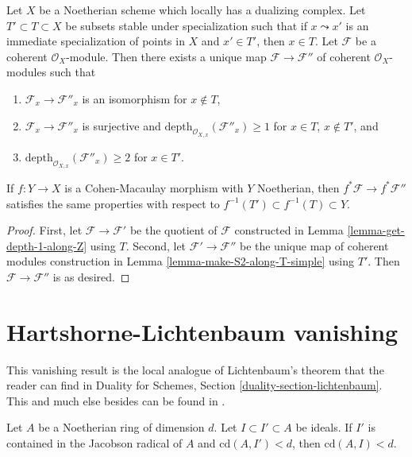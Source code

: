 \begin{lemma}
\label{lemma-make-S2-along-T}
Let $X$ be a Noetherian scheme which locally has a dualizing complex.
Let $T' \subset T \subset X$ be subsets stable under specialization
such that if $x \leadsto x'$ is an immediate specialization
of points in $X$ and $x' \in T'$, then $x \in T$. Let $\mathcal{F}$
be a coherent $\mathcal{O}_X$-module.
Then there exists a unique map $\mathcal{F} \to \mathcal{F}''$
of coherent $\mathcal{O}_X$-modules such that
\begin{enumerate}
\item $\mathcal{F}_x \to \mathcal{F}''_x$ is an isomorphism
for $x \not \in T$,
\item $\mathcal{F}_x \to \mathcal{F}''_x$ is surjective
and $\text{depth}_{\mathcal{O}_{X, x}}(\mathcal{F}''_x) \geq 1$
for $x \in T$, $x \not \in T'$, and
\item $\text{depth}_{\mathcal{O}_{X, x}}(\mathcal{F}''_x) \geq 2$
for $x \in T'$.
\end{enumerate}
If $f : Y \to X$ is a Cohen-Macaulay morphism with $Y$ Noetherian,
then $f^*\mathcal{F} \to f^*\mathcal{F}''$ satisfies the same properties
with respect to $f^{-1}(T') \subset f^{-1}(T) \subset Y$.
\end{lemma}

\begin{proof}
First, let $\mathcal{F} \to \mathcal{F}'$ be the quotient of $\mathcal{F}$
constructed in Lemma \ref{lemma-get-depth-1-along-Z} using $T$.
Second, let $\mathcal{F}' \to \mathcal{F}''$ be the unique
map of coherent modules construction in
Lemma \ref{lemma-make-S2-along-T-simple} using $T'$.
Then $\mathcal{F} \to \mathcal{F}''$ is as desired.
\end{proof}










\section{Hartshorne-Lichtenbaum vanishing}
\label{section-Hartshorne-Lichtenbaum-vanishing}

\noindent
This vanishing result is the local analogue of
Lichtenbaum's theorem that the reader can find
in Duality for Schemes, Section \ref{duality-section-lichtenbaum}.
This and much else besides can be found in \cite{CD}.

\begin{lemma}
\label{lemma-cd-top-vanishing}
Let $A$ be a Noetherian ring of dimension $d$. Let $I \subset I' \subset A$
be ideals. If $I'$ is contained in the Jacobson radical
of $A$ and $\text{cd}(A, I') < d$, then $\text{cd}(A, I) < d$.
\end{lemma}


